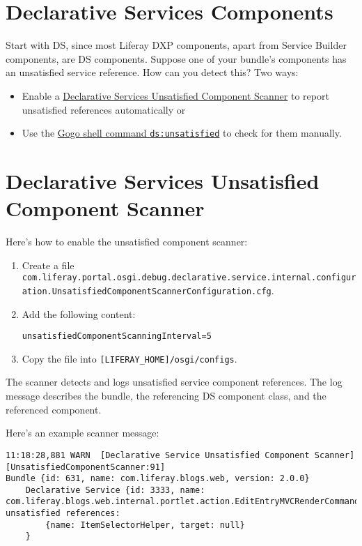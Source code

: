 \section{Declarative Services
Components}\label{declarative-services-components}

Start with DS, since most Liferay DXP components, apart from Service
Builder components, are DS components. Suppose one of your bundle's
components has an unsatisfied service reference. How can you detect
this? Two ways:

\begin{itemize}
\item
  Enable a
  \hyperref[declarative-services-unsatisfied-component-scanner]{Declarative
  Services Unsatisfied Component Scanner} to report unsatisfied
  references automatically or
\item
  Use the \hyperref[dsunsatisfied-command]{Gogo shell command
  \texttt{ds:unsatisfied}} to check for them manually.
\end{itemize}

\section{Declarative Services Unsatisfied Component
Scanner}\label{declarative-services-unsatisfied-component-scanner}

Here's how to enable the unsatisfied component scanner:

\begin{enumerate}
\def\labelenumi{\arabic{enumi}.}
\item
  Create a file
  \texttt{com.liferay.portal.osgi.debug.declarative.service.internal.configuration.UnsatisfiedComponentScannerConfiguration.cfg}.
\item
  Add the following content:

\begin{verbatim}
unsatisfiedComponentScanningInterval=5
\end{verbatim}
\item
  Copy the file into \texttt{{[}LIFERAY\_HOME{]}/osgi/configs}.
\end{enumerate}

The scanner detects and logs unsatisfied service component references.
The log message describes the bundle, the referencing DS component
class, and the referenced component.

Here's an example scanner message:

\begin{verbatim}
11:18:28,881 WARN  [Declarative Service Unsatisfied Component Scanner][UnsatisfiedComponentScanner:91]
Bundle {id: 631, name: com.liferay.blogs.web, version: 2.0.0}
    Declarative Service {id: 3333, name: com.liferay.blogs.web.internal.portlet.action.EditEntryMVCRenderCommand, unsatisfied references:
        {name: ItemSelectorHelper, target: null}
    }
\end{verbatim}

